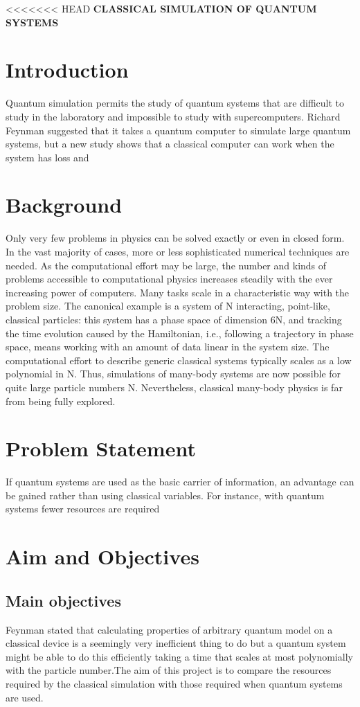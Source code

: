\documentclass[options]{article}
\begin{document}
<<<<<<< HEAD
\textbf{CLASSICAL SIMULATION OF QUANTUM SYSTEMS}

\section{\textbf{ Introduction}}
Quantum simulation permits the study of quantum systems that are difficult to study in the laboratory and impossible to study with supercomputers.
Richard Feynman suggested that it takes a quantum computer to simulate large quantum systems, but a new study shows that a classical computer can work when the system has loss and 


\section{\textbf{ Background }}
Only very few problems in physics can be solved exactly or even in closed form. In the vast majority of cases, more or less sophisticated numerical techniques are needed. As the computational effort may be large, the number and kinds of problems accessible to computational physics increases steadily with the ever increasing power of computers. Many tasks scale in a characteristic way with the problem size. The canonical example is a system of N interacting, point-like, classical particles: this system has a phase space of dimension 6N, and tracking the time evolution caused by the Hamiltonian, i.e., following a trajectory in phase space, means working with an amount of data linear in the system size. The computational effort to describe generic classical systems typically scales as a low polynomial in N. Thus, simulations of many-body systems are now possible for quite large particle numbers N. Nevertheless, classical many-body physics is far from being fully explored.

\section{\textbf{ Problem Statement}}
If quantum systems are used as the basic carrier of information, an advantage can be gained rather than using classical variables. For instance, with quantum systems fewer resources are required

\section{\textbf{ Aim and Objectives}}

\subsection{Main objectives}
Feynman stated that calculating properties of arbitrary quantum model on a classical device is a seemingly very inefficient thing to do but a quantum system might be able to do this efficiently taking a time that scales at most polynomially with the particle number.The aim of this project is to compare the resources required by the classical simulation with those required when quantum systems are used.
\end{document}
